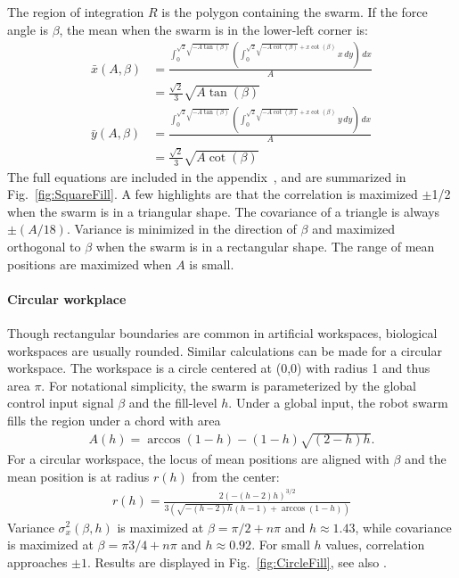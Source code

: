 The region of integration $R$ is the polygon containing the swarm. If the force angle is $\beta$, the mean when the swarm is in the lower-left corner is:
\begin{align}\label{eq:meanInSquareWorkspaceLL}
\bar{x}(A,\beta) &= \frac{\int_0^{\sqrt{2} \sqrt{-A \tan (\beta )}} \left(\int_0^{\sqrt{2} \sqrt{-A \cot (\beta )}+x \cot (\beta )} x \, dy\right) \, dx}{A} \nonumber \\
	&=\frac{ \sqrt{2}}{3} \sqrt{A \tan (\beta )}\\
\bar{y}(A,\beta) &= \frac{\int_0^{\sqrt{2} \sqrt{-A \tan (\beta )}} \left(\int_0^{\sqrt{2} \sqrt{-A \cot (\beta )}+x \cot (\beta )} y \, dy\right) \, dx}{A} \nonumber\\
	&=\frac{\sqrt{2}}{3}  \sqrt{A \cot (\beta )}
\end{align}
The full equations are included in the appendix~\citep{2016arXiv160901830S}, and are summarized in Fig.~\ref{fig:SquareFill}. A few highlights are that the correlation is maximized $\pm$1/2 when the swarm is in a triangular shape. The covariance of a triangle is always $\pm(A/18)$. Variance is minimized in the direction of $\beta$ and maximized orthogonal to $\beta$ when the swarm is in a rectangular shape. The range of mean positions are maximized when $A$ is small.

\paragraph{Circular workplace}
Though rectangular boundaries are common in artificial workspaces, biological workspaces are usually rounded.
Similar calculations can be made for a circular workspace.  The workspace is a circle centered at (0,0) with radius 1 and thus area $\pi$.
For notational simplicity, the swarm is parameterized by the global control input signal $\beta$ and the fill-level $h$.  
Under a global input, the robot swarm fills the region under a chord with area
\begin{align}
A(h) = \arccos(1-h)-(1-h) \sqrt{(2-h) h}.
\end{align}
For a circular workspace, the locus of mean positions are aligned with $\beta$ and the mean position is at radius $r(h)$ from the center:
\begin{align}
r(h) = \frac{2 (-(h-2) h)^{3/2}}{3 \left(\sqrt{-(h-2) h} (h-1)+\arccos(1-h)\right)}
\end{align}
Variance $\sigma^2_x(\beta,h)$ is maximized at $\beta = \pi/2+n \pi$ and $h\approx1.43$, while covariance is maximized at $\beta = \pi3/4+n \pi$ and $h\approx0.92.$ For small $h$ values, correlation approaches $\pm1$. Results are displayed in Fig.~\ref{fig:CircleFill}, see also \citep{Zhao2016mathematica}.

